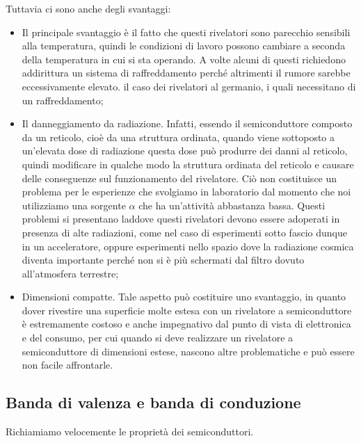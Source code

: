 Tuttavia ci sono anche degli svantaggi:
\begin{itemize}[leftmargin=0.5cm]
   \item Il principale svantaggio è il fatto che questi rivelatori sono parecchio sensibili alla temperatura, quindi le condizioni di lavoro possono cambiare a seconda della temperatura in cui si sta operando. A volte alcuni di questi richiedono addirittura un sistema di raffreddamento perché altrimenti il rumore sarebbe eccessivamente elevato. \E il caso dei rivelatori al germanio, i quali necessitano di un raffreddamento;
   \item Il danneggiamento da radiazione. Infatti, essendo il semiconduttore composto da un reticolo, cioè da una struttura ordinata, quando viene sottoposto a un'elevata dose di radiazione questa dose può produrre dei danni al reticolo, quindi modificare in qualche modo la struttura ordinata del reticolo e causare delle conseguenze sul funzionamento del rivelatore. Ciò non costituisce un problema per le esperienze che svolgiamo in laboratorio dal momento che noi utilizziamo una sorgente $\alpha$ che ha un'attività abbastanza bassa. Questi problemi si presentano laddove questi rivelatori devono essere adoperati in presenza di alte radiazioni, come nel caso di esperimenti sotto fascio dunque in un acceleratore, oppure esperimenti nello spazio dove la radiazione cosmica diventa importante perché non si è più schermati dal filtro dovuto all'atmosfera terrestre;
   \item Dimensioni compatte. Tale aspetto può costituire uno svantaggio, in quanto dover rivestire una superficie molte estesa con un rivelatore a semiconduttore è estremamente costoso e anche impegnativo dal punto di vista di elettronica e del consumo, per cui quando si deve realizzare un rivelatore a semiconduttore di dimensioni estese, nascono altre problematiche e può essere non facile affrontarle.
\end{itemize}

\subsection{Banda di valenza e banda di conduzione}
Richiamiamo velocemente le proprietà dei semiconduttori.

